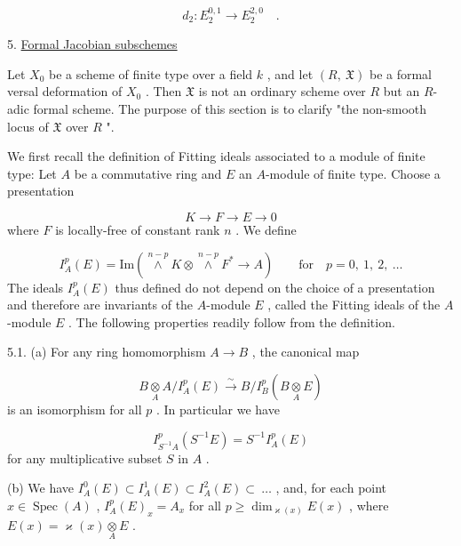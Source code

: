 \begin{equation*}
d_2 : E_2^{0,1} \to E_2^{2,0} \quad .
\end{equation*}

5.  \underline{Formal Jacobian subschemes}

Let  $X_0$  be a scheme of finite type over a field  $k$ , and let  $(R,\ \mathfrak{X})$  be a formal versal deformation of  $X_0$ . Then  $\mathfrak{X}$  is not an ordinary scheme over  $R$  but an $R$-adic formal scheme. The purpose of this section is to clarify  "the non-smooth locus of  $\mathfrak{X}$  over  $R$ ".

We first recall the definition of Fitting ideals associated to a module of finite type: Let  $A$  be a commutative ring and  $E$  an $A$-module of finite type. Choose a presentation

\begin{equation*}
K \to F \to E \to 0
\end{equation*}
where  $F$  is locally-free of constant rank  $n$ . We define

\begin{equation*}
I^p_A(E) = \mathrm{Im}(\overset{n-p}{\wedge} K \otimes \overset{n-p}{\wedge} F^* \to A) \qquad \text{for}\quad p = 0,\ 1,\ 2,\ \ldots
\end{equation*}
The ideals  $I^p_A(E)$  thus defined do not depend on the choice of a presentation and therefore are invariants of the $A$-module  $E$ , called the Fitting ideals of the $A$-module  $E$ . The following properties readily follow from the definition.

5.1.    (a) For any ring homomorphism  $A \to B$ , the canonical map

\begin{equation*}
B \underset{A}{\otimes} A/I^p_A(E) \overset{\sim}{\to} B/I^p_B(B \underset{A}{\otimes} E)
\end{equation*}
is an isomorphism for all  $p$ . In particular we have

\begin{equation*}
I^p_{S^{-1}A}(S^{-1}E) = S^{-1}I^p_A(E)
\end{equation*}
for any multiplicative subset  $S$  in  $A$ .



(b)  We have  $I_A^0(E) \subset I_A^1(E) \subset I_A^2(E) \subset \ \dots$ , and, for each point $x \in \operatorname{Spec}(A)$ , $I_A^p(E)_x = A_x$  for all  $p \geq \dim_{\varkappa(x)} E(x)$ , where  $E(x) = \varkappa(x) \underset{A}{\otimes} E$ .

